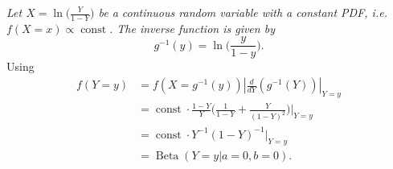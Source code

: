 \begin{example}
	\emph{Let $X = \ln\big(\frac{Y}{1-Y}\big)$ be a continuous random variable with a constant PDF, i.e. $f(X=x)\propto \operatorname{const}$. The inverse function is given by}
	\begin{equation}
		g^{-1}(y) = \ln\bigg(\frac{y}{1-y}\bigg).
	\end{equation}
	Using 
	\begin{equation}
		\begin{split}
			f(Y=y) &= f\left( X = g^{-1}(y) \right) \left| \frac{d}{d Y} \left( g^{-1}(Y) \right) \right|_{Y=y}\\
			& = \operatorname{const}\cdot \frac{1-Y}{Y}\bigg(\frac{1}{1-Y}+\frac{Y}{(1-Y)^2}\bigg)\bigg|_{Y=y}\\
			&=\operatorname{const}\cdot Y^{-1}(1-Y)^{-1}|_{Y=y}\\
			&=\operatorname{Beta}(Y=y|a=0,b=0).
		\end{split}
	\end{equation}
\end{example}


